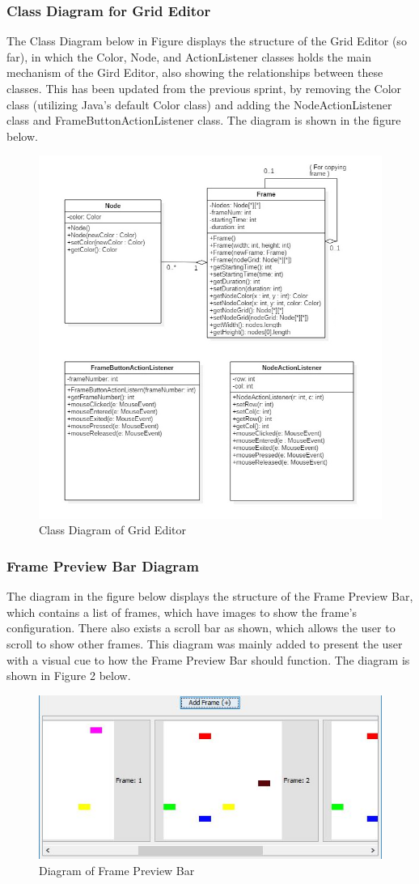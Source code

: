 \documentclass[12pt]{article}
\begin{document}
\begin{appendices}
      \subsubsection {Class Diagram for Grid Editor}
        The Class Diagram below in Figure displays the structure of the Grid Editor (so far), in which the Color, Node, and ActionListener classes holds the main mechanism of the Gird Editor, also showing the relationships between these classes. This has been updated from the previous sprint, by removing the Color class (utilizing Java's default Color class) and adding the NodeActionListener class and FrameButtonActionListener class. The diagram is shown in the figure below.
      
      \begin{figure}[h]
        \centering
        \includegraphics[width=.4\linewidth]{Class_Diagram_Frame_Node_and_ActionListener_Classes.JPG}
        \caption{Class Diagram of Grid Editor \label{overflow}}
      \end{figure}
    
      \subsubsection {Frame Preview Bar Diagram}
        The diagram in the figure below displays the structure of the Frame Preview Bar, which contains a list of frames, which have images to show the frame's configuration. There also exists a scroll bar as shown, which allows the user to scroll to show other frames. This diagram was mainly added to present the user with a visual cue to how the Frame Preview Bar should function. The diagram is shown in Figure 2 below.
      
      \begin{figure}[ht!]
        \centering
        \includegraphics[width=.6\linewidth]{potoFramePre.JPG}
        \caption{Diagram of Frame Preview Bar \label{overflow}}
      \end{figure}
    

\end{appendices}
\end{document}
